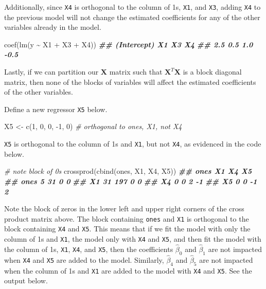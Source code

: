 \documentclass[
]{book}
\newenvironment{Shaded}{\begin{snugshade}}{\end{snugshade}}
\newcommand{\CommentTok}[1]{\textcolor[rgb]{0.56,0.35,0.01}{\textit{#1}}}
\newcommand{\DecValTok}[1]{\textcolor[rgb]{0.00,0.00,0.81}{#1}}
\newcommand{\DocumentationTok}[1]{\textcolor[rgb]{0.56,0.35,0.01}{\textbf{\textit{#1}}}}
\newcommand{\FunctionTok}[1]{\textcolor[rgb]{0.00,0.00,0.00}{#1}}
\newcommand{\NormalTok}[1]{#1}
\newcommand{\OtherTok}[1]{\textcolor[rgb]{0.56,0.35,0.01}{#1}}
\newcommand{\SpecialCharTok}[1]{\textcolor[rgb]{0.00,0.00,0.00}{#1}}
\theoremstyle{definition}
\theoremstyle{definition}
\theoremstyle{definition}
\theoremstyle{definition}
\theoremstyle{remark}
\begin{document}
Additionally, since \texttt{X4} is orthogonal to the column of 1s, \texttt{X1}, and
\texttt{X3}, adding \texttt{X4} to the previous model will not change the estimated
coefficients for any of the other variables already in the model.

\begin{Shaded}
\begin{Highlighting}[]
\FunctionTok{coef}\NormalTok{(}\FunctionTok{lm}\NormalTok{(y }\SpecialCharTok{\textasciitilde{}}\NormalTok{ X1 }\SpecialCharTok{+}\NormalTok{ X3 }\SpecialCharTok{+}\NormalTok{ X4))}
\DocumentationTok{\#\# (Intercept)          X1          X3          X4 }
\DocumentationTok{\#\#         2.5         0.5         1.0        {-}0.5}
\end{Highlighting}
\end{Shaded}

Lastly, if we can partition our \(\mathbf{X}\) matrix such that
\(\mathbf{X}^T \mathbf{X}\) is a block diagonal matrix, then none of the
blocks of variables will affect the estimated coefficients of the other
variables.

Define a new regressor \texttt{X5} below.

\begin{Shaded}
\begin{Highlighting}[]
\NormalTok{X5 }\OtherTok{\textless{}{-}} \FunctionTok{c}\NormalTok{(}\DecValTok{1}\NormalTok{, }\DecValTok{0}\NormalTok{, }\DecValTok{0}\NormalTok{, }\SpecialCharTok{{-}}\DecValTok{1}\NormalTok{, }\DecValTok{0}\NormalTok{) }\CommentTok{\# orthogonal to ones, X1, not X4}
\end{Highlighting}
\end{Shaded}

\texttt{X5} is orthogonal to the column of
1s and \texttt{X1}, but not \texttt{X4}, as evidenced in the code below.

\begin{Shaded}
\begin{Highlighting}[]
\CommentTok{\# note block of 0s}
\FunctionTok{crossprod}\NormalTok{(}\FunctionTok{cbind}\NormalTok{(ones, X1, X4, X5))}
\DocumentationTok{\#\#      ones  X1 X4 X5}
\DocumentationTok{\#\# ones    5  31  0  0}
\DocumentationTok{\#\# X1     31 197  0  0}
\DocumentationTok{\#\# X4      0   0  2 {-}1}
\DocumentationTok{\#\# X5      0   0 {-}1  2}
\end{Highlighting}
\end{Shaded}

Note the block of zeros in the lower left and upper right corners of the
cross product matrix above. The block containing \texttt{ones} and \texttt{X1} is
orthogonal to the block containing \texttt{X4} and \texttt{X5}. This means that if we
fit the model with only the column of 1s and \texttt{X1}, the model only with
\texttt{X4} and \texttt{X5}, and then fit the model with the column of 1s, \texttt{X1}, \texttt{X4},
and \texttt{X5}, then the coefficients \(\hat{\beta}_{0}\) and \(\hat{\beta}_{1}\)
are not impacted when \texttt{X4} and \texttt{X5} are added to the model. Similarly,
\(\hat{\beta}_{4}\) and \(\hat{\beta}_{5}\) are not impacted when the column
of 1s and \texttt{X1} are added to the model with \texttt{X4} and \texttt{X5}. See the output below.
\end{document}
